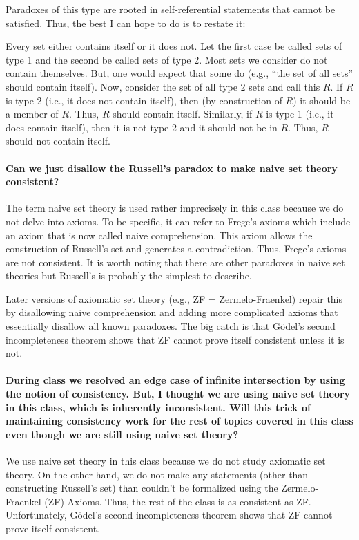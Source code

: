 \documentclass[10pt,english]{article}
\begin{document}
Paradoxes of this type are rooted in self-referential statements that cannot be satisfied.
Thus, the best I can hope to do is to restate it:

Every set either contains itself or it does not.
Let the first case be called sets of type 1 and the second be called sets of type 2.
Most sets we consider do not contain themselves.
But, one would expect that some do (e.g., ``the set of all sets'' should contain itself).
Now, consider the set of all type 2 sets and call this $R$.
If $R$ is type 2 (i.e., it does not contain itself), then (by construction of $R$) it should be a member of $R$.
Thus, $R$ should contain itself.
Similarly, if $R$ is type 1 (i.e., it does contain itself), then it is not type 2 and it should not be in $R$.  
Thus, $R$ should not contain itself.

\paragraph{Can we just disallow the Russell's paradox to make naive set theory consistent?}

The term naive set theory is used rather imprecisely in this class because we do not delve into axioms.
To be specific, it can refer to Frege's axioms which include an axiom that is now called naive comprehension.
This axiom allows the construction of Russell's set and generates a contradiction.
Thus, Frege's axioms are not consistent.
It is worth noting that there are other paradoxes in naive set theories but Russell's is probably the simplest to describe.

Later versions of axiomatic set theory (e.g., ZF = Zermelo-Fraenkel) repair this by disallowing naive comprehension and adding more complicated axioms that essentially disallow all known paradoxes.
The big catch is that G\"{o}del's second incompleteness theorem shows that ZF cannot prove itself consistent unless it is not.

\paragraph{During class we resolved an edge case of infinite intersection by using the notion of consistency.  But, I thought we are using naive set theory in this class, which is inherently inconsistent. Will this trick of maintaining consistency work for the rest of topics covered in this class even though we are still using naive set theory?}

We use naive set theory in this class because we do not study axiomatic set theory.
On the other hand, we do not make any statements (other than constructing Russell's set) than couldn't be formalized using the Zermelo-Fraenkel (ZF) Axioms.
Thus, the rest of the class is as consistent as ZF.
Unfortunately, G\"{o}del's second incompleteness theorem shows that ZF cannot prove itself consistent.
\end{document}

